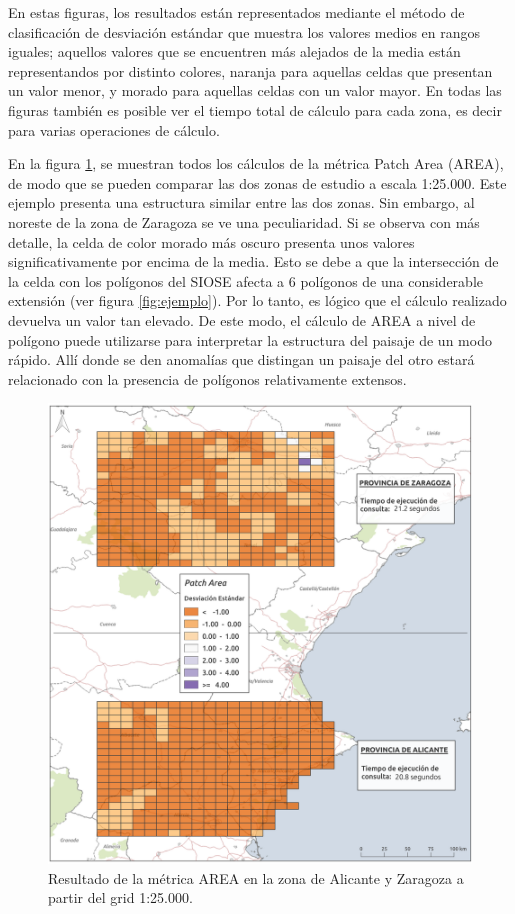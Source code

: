 En estas figuras, los resultados están representados mediante el método de clasificación de desviación estándar que muestra los valores medios en rangos iguales; aquellos valores que se encuentren más alejados de la media están representandos por distinto colores, naranja para aquellas celdas que presentan un valor menor, y morado para aquellas celdas con un valor mayor. En todas las figuras también es posible ver el tiempo total de cálculo para cada zona, es decir para varias operaciones de cálculo.

En la figura \ref{fig:p_25}, se muestran todos los cálculos de la métrica Patch Area (AREA), de modo que se pueden comparar las dos zonas de estudio a escala 1:25.000. Este ejemplo presenta una estructura similar entre las dos zonas. Sin embargo, al noreste de la zona de Zaragoza se ve una peculiaridad. Si se observa con más detalle, la celda de color morado más oscuro presenta unos valores significativamente por encima de la media. Esto se debe a que la intersección de la celda con los polígonos del SIOSE afecta a 6 polígonos de una considerable extensión (ver figura \ref{fig:ejemplo}). Por lo tanto, es lógico que el cálculo realizado devuelva un valor tan elevado. De este modo, el cálculo de AREA a nivel de polígono puede utilizarse para interpretar la estructura del paisaje de un modo rápido. Allí donde se den anomalías que distingan un paisaje del otro estará relacionado con la presencia de polígonos relativamente extensos.

\begin{figure}
\begin{center}
\includegraphics[width=\textwidth]{ResultadosyDiscusion/Figs/Results/p_25.png}
\caption{Resultado de la métrica AREA en la zona de Alicante y Zaragoza a partir del grid 1:25.000. \label{fig:p_25}}
\end{center}
\end{figure}

